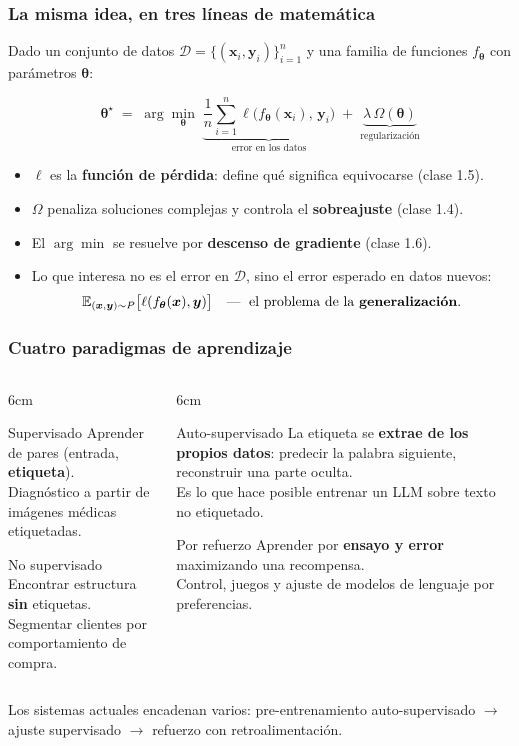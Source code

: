 \documentclass[aspectratio=169, 10pt]{beamer}
\newcommand{\E}{\mathbb{E}}
\newcommand{\x}{\bm{x}}
\newcommand{\y}{\bm{y}}
\newcommand{\formula}[1]{%
	\begin{tcolorbox}[colback=UCMBlue!8, colframe=UCMBlue, arc=4pt,
		boxsep=2pt, left=6pt, right=6pt, top=3pt, bottom=3pt]
		#1
	\end{tcolorbox}
}
\begin{document}
\begin{frame}
\frametitle{La misma idea, en tres líneas de matemática}
Dado un conjunto de datos $\mathcal{D}=\{(\x_i,\y_i)\}_{i=1}^{n}$ y una familia de funciones $f_{\bm\theta}$ con par\'ametros $\bm\theta$:
\formula{
\[
\bm\theta^{\star} \;=\; \arg\min_{\bm\theta}\; \underbrace{\frac{1}{n}\sum_{i=1}^{n} \ell\big(f_{\bm\theta}(\x_i),\, \y_i\big)}_{\text{error en los datos}} \;+\; \underbrace{\lambda\, \Omega(\bm\theta)}_{\text{regularizaci\'on}}
\]}
\pause
\begin{itemize}
	\item $\ell$ es la \textbf{funci\'on de p\'erdida}: define qu\'e significa equivocarse (clase 1.5).
	\item $\Omega$ penaliza soluciones complejas y controla el \textbf{sobreajuste} (clase 1.4).
	\item El $\arg\min$ se resuelve por \textbf{descenso de gradiente} (clase 1.6).
	\pause
	\item Lo que interesa no es el error en $\mathcal{D}$, sino el error esperado en datos nuevos:
	\[ \E_{(\x,\y)\sim P}\big[\ell(f_{\bm\theta}(\x),\y)\big] \quad\text{---\; el problema de la \textbf{generalizaci\'on}.} \]
\end{itemize}
\end{frame}

\begin{frame}
\frametitle{Cuatro paradigmas de aprendizaje}
\begin{columns}[T]
\begin{column}{6cm}
\begin{block}{Supervisado}
Aprender de pares (entrada, \textbf{etiqueta}).\\
{\scriptsize Diagn\'ostico a partir de im\'agenes m\'edicas etiquetadas.}
\end{block}
\begin{block}{No supervisado}
Encontrar estructura \textbf{sin} etiquetas.\\
{\scriptsize Segmentar clientes por comportamiento de compra.}
\end{block}
\end{column}
\begin{column}{6cm}
\begin{block}{Auto-supervisado}
La etiqueta se \textbf{extrae de los propios datos}: predecir la palabra siguiente, reconstruir una parte oculta.\\
{\scriptsize Es lo que hace posible entrenar un LLM sobre texto no etiquetado.}
\end{block}
\begin{block}{Por refuerzo}
Aprender por \textbf{ensayo y error} maximizando una recompensa.\\
{\scriptsize Control, juegos y ajuste de modelos de lenguaje por preferencias.}
\end{block}
\end{column}
\end{columns}
\vspace{0.4em}
\footnotesize Los sistemas actuales encadenan varios: pre-entrenamiento auto-supervisado $\rightarrow$ ajuste supervisado $\rightarrow$ refuerzo con retroalimentaci\'on.
\end{frame}
\end{document}
